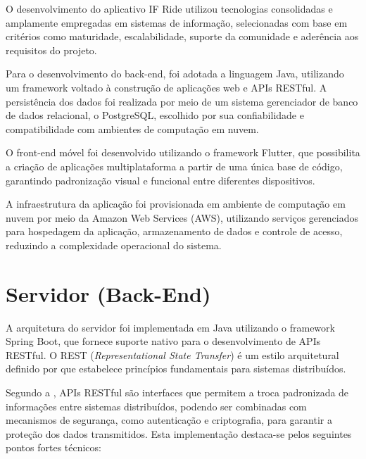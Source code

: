 O desenvolvimento do aplicativo IF Ride utilizou tecnologias consolidadas e amplamente empregadas em sistemas de informação, selecionadas com base em critérios como maturidade, escalabilidade, suporte da comunidade e aderência aos requisitos do projeto.

Para o desenvolvimento do back-end, foi adotada a linguagem Java, utilizando um framework voltado à construção de aplicações web e APIs RESTful. A persistência dos dados foi realizada por meio de um sistema gerenciador de banco de dados relacional, o PostgreSQL, escolhido por sua confiabilidade e compatibilidade com ambientes de computação em nuvem.

O front-end móvel foi desenvolvido utilizando o framework Flutter, que possibilita a criação de aplicações multiplataforma a partir de uma única base de código, garantindo padronização visual e funcional entre diferentes dispositivos.

A infraestrutura da aplicação foi provisionada em ambiente de computação em nuvem por meio da Amazon Web Services (AWS), utilizando serviços gerenciados para hospedagem da aplicação, armazenamento de dados e controle de acesso, reduzindo a complexidade operacional do sistema.


\section{Servidor (Back-End)}
A arquitetura do servidor foi implementada em Java utilizando o framework Spring Boot, que fornece suporte nativo para o desenvolvimento de APIs RESTful. O REST (\textit{Representational State Transfer}) é um estilo arquitetural definido por  que estabelece princípios fundamentais para sistemas distribuídos.

Segundo a , APIs RESTful são interfaces que permitem a troca padronizada de informações entre sistemas distribuídos, podendo ser combinadas com mecanismos de segurança, como autenticação e criptografia, para garantir a proteção dos dados transmitidos. Esta implementação destaca-se pelos seguintes pontos fortes técnicos:

